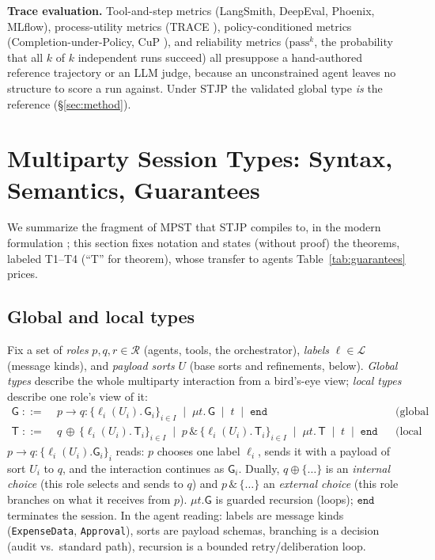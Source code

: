 \documentclass{article}
\newcommand{\gtG}{\mathsf{G}}
\newcommand{\lt}{\mathsf{T}}
\newcommand{\ed}{\mathtt{end}}
\newcommand{\sends}{\rightarrow}
\newcommand{\lbl}{\ell}
\newcommand{\stjp}{\textsc{STJP}}
\begin{document}
\textbf{Trace evaluation.} Tool-and-step metrics (LangSmith, DeepEval, Phoenix, MLflow), process-utility metrics (TRACE \citep{trace}), policy-conditioned metrics (Completion-under-Policy, CuP \citep{stweb}), and reliability metrics ($\mathrm{pass}^k$, the probability that all $k$ of $k$ independent runs succeed) all presuppose a hand-authored reference trajectory or an LLM judge, because an unconstrained agent leaves no structure to score a run against. Under \stjp{} the validated global type \emph{is} the reference (\S\ref{sec:method}).

\section{Multiparty Session Types: Syntax, Semantics, Guarantees}\label{sec:mpst}
We summarize the fragment of MPST that \stjp{} compiles to, in the modern formulation \citep{hyc08,scalas19}; this section fixes notation and states (without proof) the theorems, labeled T1--T4 (``T'' for theorem), whose transfer to agents Table~\ref{tab:guarantees} prices.

\subsection{Global and local types}
Fix a set of \emph{roles} $p,q,r\in\mathcal{R}$ (agents, tools, the orchestrator), \emph{labels} $\lbl\in\mathcal{L}$ (message kinds), and \emph{payload sorts} $U$ (base sorts and refinements, below). \emph{Global types} describe the whole multiparty interaction from a bird's-eye view; \emph{local types} describe one role's view of it:
\begin{align*}
\gtG \;::=\;& p \sends q : \{\lbl_i(U_i).\,\gtG_i\}_{i\in I} \;\mid\; \mu t.\,\gtG \;\mid\; t \;\mid\; \ed
&& \text{(global types)}\\
\lt \;::=\;& q\,{\oplus}\,\{\lbl_i(U_i).\,\lt_i\}_{i\in I} \;\mid\; p\,\&\,\{\lbl_i(U_i).\,\lt_i\}_{i\in I} \;\mid\; \mu t.\,\lt \;\mid\; t \;\mid\; \ed
&& \text{(local types)}
\end{align*}
$p \sends q:\{\lbl_i(U_i).\gtG_i\}_{i}$ reads: $p$ chooses one label $\lbl_i$, sends it with a payload of sort $U_i$ to $q$, and the interaction continues as $\gtG_i$. Dually, $q\oplus\{\ldots\}$ is an \emph{internal choice} (this role selects and sends to $q$) and $p\,\&\,\{\ldots\}$ an \emph{external choice} (this role branches on what it receives from $p$). $\mu t.\gtG$ is guarded recursion (loops); $\ed$ terminates the session. In the agent reading: labels are message kinds (\texttt{ExpenseData}, \texttt{Approval}), sorts are payload schemas, branching is a decision (audit vs.\ standard path), recursion is a bounded retry/deliberation loop.
\end{document}
